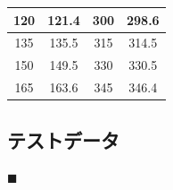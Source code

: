\documentclass[twocolumn,a4j]{jsarticle}
\begin{document}
\begin{table}[htbp]
\begin{center}
\begin{tabular}{|p{20mm}|p{20mm}|p{20mm}|p{20mm}|}
            \multicolumn{1}{|c|}{120}                   & \multicolumn{1}{|c|}{121.4}                 & \multicolumn{1}{|c|}{300}                   & \multicolumn{1}{|c|}{298.6}                 \\ \hline
            \multicolumn{1}{|c|}{135}                   & \multicolumn{1}{|c|}{135.5}                 & \multicolumn{1}{|c|}{315}                   & \multicolumn{1}{|c|}{314.5}                 \\ \hline
            \multicolumn{1}{|c|}{150}                   & \multicolumn{1}{|c|}{149.5}                 & \multicolumn{1}{|c|}{330}                   & \multicolumn{1}{|c|}{330.5}                 \\ \hline
            \multicolumn{1}{|c|}{165}                   & \multicolumn{1}{|c|}{163.6}                 & \multicolumn{1}{|c|}{345}                   & \multicolumn{1}{|c|}{346.4}                 \\ \hline
        \end{tabular}
    \end{center}
\end{table}


\newpage

\subsection{テストデータ}

$\blacksquare$ 
\end{document}
